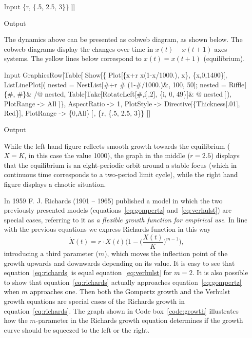 \documentclass[11pt,fleqn]{book} %
\begin{document}
\begin{theorem}
\begin{mmaCell}{Input}
    \{r, \{.5, 2.5, 3\}\}
  ]]
\end{mmaCell}
\begin{mmaCell}[moregraphics={moreig={scale=1}}]{Output}
\end{mmaCell}
The dynamics above can be presented as cobweb diagram, as shown below. The cobweb diagrams display the changes over time in $x(t)-x(t+1)$-axes-systems. The yellow lines below correspond to $x(t) = x(t+1)$ (equilibrium).
\begin{mmaCell}{Input}
  GraphicsRow[Table[
    Show[\{
      Plot[\{x+r x(1-x/1000.), x\}, \{x,0,1400\}],
      ListLinePlot[(
        nested = NestList[#+r # (1-#/1000.)\&, 100, 50];
        nested = Riffle[
          \{#, #\}\& /@ nested, 
          Table[Take[RotateLeft[#,i],2], \{i, 0, 49\}]\& @ nested
        ]), 
        PlotRange -> All
      ]\}, 
      AspectRatio -> 1,
      PlotStyle   -> Directive[\{Thickness[.01], Red\}], 
      PlotRange   -> \{0,All\}
    ],
    \{r, \{.5, 2.5, 3\}\}
  ]]
\end{mmaCell}
\begin{mmaCell}[moregraphics={moreig={scale=.6}}]{Output}
\end{mmaCell}
While the left hand figure reflects smooth growth towards the equilibrium ($X = K$, in this case the value 1000), the graph in the middle ($r = 2.5$) displays that the equilibrium is an eight-periodic orbit around a stable focus (which in continuous time corresponds to a two-period limit cycle), while the right hand figure displays a chaotic situation.
\label{code:verhulst}
\end{theorem}
\hfill \break
{}In 1959 F. J. Richards (1901 – 1965) published a model in which the two previously presented models (equations~\ref{eq:gompertz} and~\ref{eq:verhulst}) are special cases, referring to it as \textit{a flexible growth function for empirical use}\cite{Richards1959}. In line with the previous equations we express Richards function in this way
\begin{equation} 
\label{eq:richards}
\dot{X}(t) = r \cdot X(t) \bigg( 1 - \bigg(\frac{X(t)}{K}\bigg)^{m - 1} \bigg),
\end{equation}
introducing a third parameter ($m$), which moves the inflection point of the growth upwards and downwards depending on its value. It is easy to see that equation~\ref{eq:richards} is equal equation~\ref{eq:verhulst} for $m = 2$. It is also possible to show that equation~\ref{eq:richards} actually approaches equation~\ref{eq:gompertz} when $m$ approaches one. Then both the Gompertz growth and the Verhulst growth equations are special cases of the Richards growth in equation~\ref{eq:richards}. The graph shown in Code box~\ref{code:growth} illustrates how the $m$-parameter in the Richards growth equation determines if the growth curve should be squeezed to the left or the right. 
\end{document}

